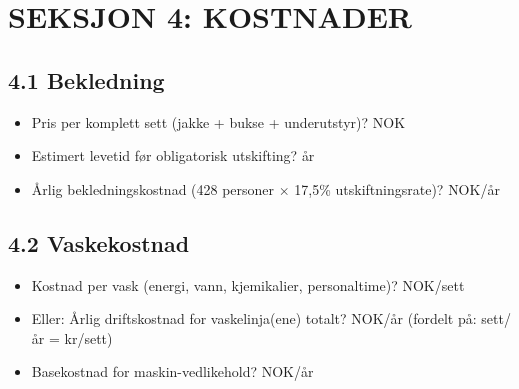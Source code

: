 \documentclass[12pt, a4paper, norsk]{article}
\begin{document}
\newpage

\section*{SEKSJON 4: KOSTNADER}

\subsection*{4.1 Bekledning}

\vspace{0.3cm}

\begin{itemize}
\item[\textbf{Q:}] Pris per komplett sett (jakke + bukse + underutstyr)?
  \newline\underline{\hspace{6cm}} NOK

\item[\textbf{Q:}] Estimert levetid før obligatorisk utskifting?
  \newline\underline{\hspace{6cm}} år

\item[\textbf{Q:}] Årlig bekledningskostnad (428 personer $\times$ 17,5\% utskiftningsrate)?
  \newline\underline{\hspace{6cm}} NOK/år
\end{itemize}

\subsection*{4.2 Vaskekostnad}

\vspace{0.3cm}

\begin{itemize}
\item[\textbf{Q:}] Kostnad per vask (energi, vann, kjemikalier, personaltime)?
  \newline\underline{\hspace{6cm}} NOK/sett

\item[\textbf{Q:}] Eller: Årlig driftskostnad for vaskelinja(ene) totalt?
  \newline\underline{\hspace{6cm}} NOK/år (fordelt på: \underline{\hspace{3cm}} sett/år = \underline{\hspace{2cm}} kr/sett)

\item[\textbf{Q:}] Basekostnad for maskin-vedlikehold?
  \newline\underline{\hspace{6cm}} NOK/år
\end{itemize}
\end{document}
